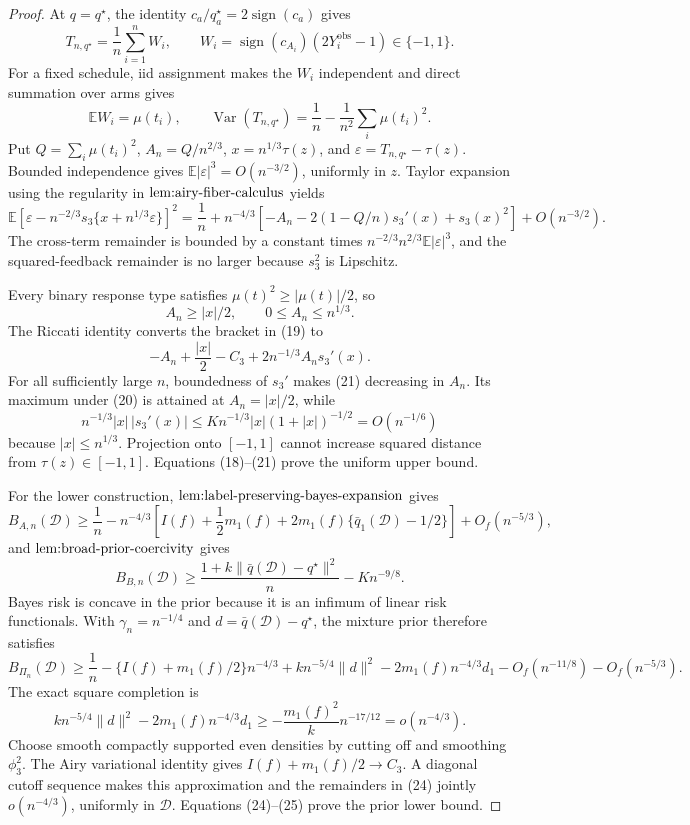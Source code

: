 \documentclass{article}
\begin{document}
\begin{proof}
At \(q=q^\star\), the identity \(c_a/q_a^\star=2\operatorname{sign}(c_a)\) gives
\[
T_{n,q^\star}=\frac1n\sum_{i=1}^n W_i,
\qquad
W_i=\operatorname{sign}(c_{A_i})(2Y_i^{\mathrm{obs}}-1)\in\{-1,1\}.
\]
For a fixed schedule, iid assignment makes the \(W_i\) independent and direct summation over arms gives
\[
\mathbb EW_i=\mu(t_i),
\qquad
\operatorname{Var}(T_{n,q^\star})
=\frac1n-\frac1{n^2}\sum_i\mu(t_i)^2.
\tag{18}
\]
Put \(Q=\sum_i\mu(t_i)^2\), \(A_n=Q/n^{2/3}\), \(x=n^{1/3}\tau(z)\), and \(\varepsilon=T_{n,q^\star}-\tau(z)\).  Bounded independence gives \(\mathbb E|\varepsilon|^3=O(n^{-3/2})\), uniformly in \(z\).  Taylor expansion using the regularity in \(\textnormal{lem:airy-fiber-calculus}\) yields
\[
\mathbb E\left[
\varepsilon-n^{-2/3}s_3\{x+n^{1/3}\varepsilon\}
\right]^2
=\frac1n+n^{-4/3}
\left[-A_n-2(1-Q/n)s_3'(x)+s_3(x)^2\right]
+O(n^{-3/2}).
\tag{19}
\]
The cross-term remainder is bounded by a constant times \(n^{-2/3}n^{2/3}\mathbb E|\varepsilon|^3\), and the squared-feedback remainder is no larger because \(s_3^2\) is Lipschitz.

Every binary response type satisfies \(\mu(t)^2\geq|\mu(t)|/2\), so
\[
A_n\geq |x|/2,
\qquad 0\leq A_n\leq n^{1/3}.
\tag{20}
\]
The Riccati identity converts the bracket in (19) to
\[
-A_n+\frac{|x|}{2}-C_3+2n^{-1/3}A_ns_3'(x).
\tag{21}
\]
For all sufficiently large \(n\), boundedness of \(s_3'\) makes (21) decreasing in \(A_n\).  Its maximum under (20) is attained at \(A_n=|x|/2\), while
\[
n^{-1/3}|x|\,|s_3'(x)|
\leq K n^{-1/3}|x|(1+|x|)^{-1/2}=O(n^{-1/6})
\]
because \(|x|\leq n^{1/3}\).  Projection onto \([-1,1]\) cannot increase squared distance from \(\tau(z)\in[-1,1]\).  Equations (18)--(21) prove the uniform upper bound.

For the lower construction, \(\textnormal{lem:label-preserving-bayes-expansion}\) gives
\[
B_{A,n}(\mathcal D)\geq
\frac1n-n^{-4/3}
\left[I(f)+\frac12m_1(f)+2m_1(f)
\{\bar q_1(\mathcal D)-1/2\}\right]+O_f(n^{-5/3}),
\tag{22}
\]
and \(\textnormal{lem:broad-prior-coercivity}\) gives
\[
B_{B,n}(\mathcal D)\geq
\frac{1+k\|\bar q(\mathcal D)-q^\star\|^2}{n}-Kn^{-9/8}.
\tag{23}
\]
Bayes risk is concave in the prior because it is an infimum of linear risk functionals.  With \(\gamma_n=n^{-1/4}\) and \(d=\bar q(\mathcal D)-q^\star\), the mixture prior therefore satisfies
\[
B_{\Pi_n}(\mathcal D)\geq
\frac1n-\{I(f)+m_1(f)/2\}n^{-4/3}
+k n^{-5/4}\|d\|^2
-2m_1(f)n^{-4/3}d_1
-O_f(n^{-11/8})-O_f(n^{-5/3}).
\tag{24}
\]
The exact square completion is
\[
k n^{-5/4}\|d\|^2-2m_1(f)n^{-4/3}d_1
\geq-\frac{m_1(f)^2}{k}n^{-17/12}
=o(n^{-4/3}).
\tag{25}
\]
Choose smooth compactly supported even densities by cutting off and smoothing \(\phi_3^2\).  The Airy variational identity gives \(I(f)+m_1(f)/2\to C_3\).  A diagonal cutoff sequence makes this approximation and the remainders in (24) jointly \(o(n^{-4/3})\), uniformly in \(\mathcal D\).  Equations (24)--(25) prove the prior lower bound.


\end{proof}
\end{document}
